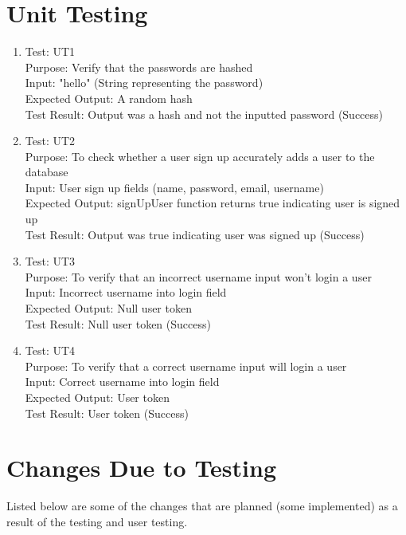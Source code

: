 \documentclass[12pt, titlepage]{article}
\begin{document}
\section{Unit Testing}
\begin{enumerate}
	\item Test: UT1 \\
	Purpose: Verify that the passwords are hashed \\
	Input: "hello" (String representing the password)\\
	Expected Output: A random hash\\
	Test Result:  Output was a hash and not the inputted password (Success)\\

  \item Test: UT2 \\
	Purpose: To check whether a user sign up accurately adds a user to the database\\
	Input: User sign up fields (name, password, email, username)\\
	Expected Output: signUpUser function returns true indicating user is signed up\\
	Test Result:  Output was true indicating user was signed up (Success)\\

  \item Test: UT3 \\
	Purpose: To verify that an incorrect username input won't login a user \\
	Input: Incorrect username into login field \\
	Expected Output: Null user token\\
	Test Result: Null user token (Success)\\

  \item Test: UT4 \\
	Purpose: To verify that a correct username input will login a user \\
	Input: Correct username into login field \\
	Expected Output: User token\\
	Test Result: User token (Success)\\
\end{enumerate}

\section{Changes Due to Testing}
Listed below are some of the changes that are planned (some implemented) as a result of the testing and user testing.
\end{document}
